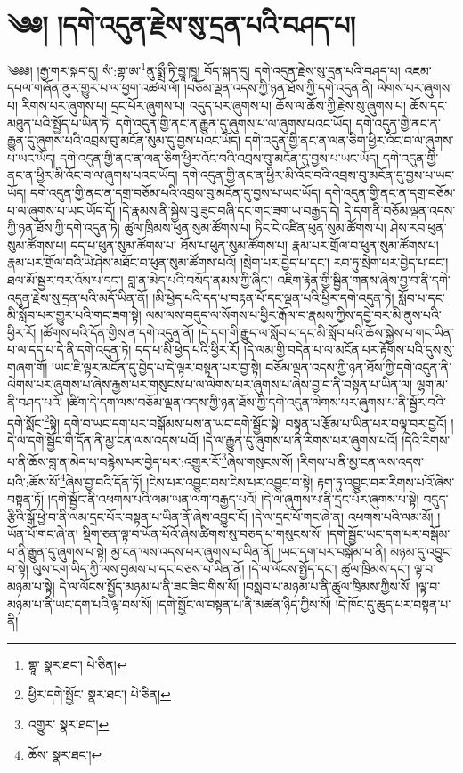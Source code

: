 \setcounter{footnote}{0} 
\chapter{༄༅། །དགེ་འདུན་རྗེས་སུ་དྲན་པའི་བཤད་པ།}༄༅༅། །རྒྱ་གར་སྐད་དུ། སཾ་:གྷ་ཨ་\footnote{གྷཱ་  སྣར་ཐང་།  པེ་ཅིན། }ནུ་སྨྲྀ་ཏི་བྱཱ་ཁྱཱ། བོད་སྐད་དུ། དགེ་འདུན་རྗེས་སུ་དྲན་པའི་བཤད་པ། འཇམ་དཔལ་གཞོན་ནུར་གྱུར་པ་ལ་ཕྱག་འཚལ་ལོ། །བཅོམ་ལྡན་འདས་ཀྱི་ཉན་ཐོས་ཀྱི་དགེ་འདུན་ནི། ལེགས་པར་ཞུགས་པ། རིགས་པར་ཞུགས་པ། དྲང་པོར་ཞུགས་པ། འདུད་པར་ཞུགས་པ། ཆོས་ལ་ཆོས་ཀྱི་རྗེས་སུ་ཞུགས་པ། ཆོས་དང་མཐུན་པའི་སྤྱོད་པ་ཡིན་ཏེ། དགེ་འདུན་གྱི་ནང་ན་རྒྱུན་དུ་ཞུགས་པ་ལ་ཞུགས་པའང་ཡོད། དགེ་འདུན་གྱི་ནང་ན་རྒྱུན་དུ་ཞུགས་པའི་འབྲས་བུ་མངོན་སུམ་དུ་བྱས་པའང་ཡོད། དགེ་འདུན་གྱི་ནང་ན་ལན་ཅིག་ཕྱིར་འོང་བ་ལ་ཞུགས་པ་ཡང་ཡོད། དགེ་འདུན་གྱི་ནང་ན་ལན་ཅིག་ཕྱིར་འོང་བའི་འབྲས་བུ་མངོན་དུ་བྱས་པ་ཡང་ཡོད། དགེ་འདུན་གྱི་ནང་ན་ཕྱིར་མི་འོང་བ་ལ་ཞུགས་པའང་ཡོད། དགེ་འདུན་གྱི་ནང་ན་ཕྱིར་མི་འོང་བའི་འབྲས་བུ་མངོན་དུ་བྱས་པ་ཡང་ཡོད། དགེ་འདུན་གྱི་ནང་ན་དགྲ་བཅོམ་པའི་འབྲས་བུ་མངོན་དུ་བྱས་པ་ཡང་ཡོད། དགེ་འདུན་གྱི་ནང་ན་དགྲ་བཅོམ་པ་ལ་ཞུགས་པ་ཡང་ཡོད་དོ། །དེ་རྣམས་ནི་སྐྱེས་བུ་ཟུང་བཞི་དང་གང་ཟག་ཡ་བརྒྱད་དེ། དེ་དག་ནི་བཅོམ་ལྡན་འདས་ཀྱི་ཉན་ཐོས་ཀྱི་དགེ་འདུན་ཏེ། ཚུལ་ཁྲིམས་ཕུན་སུམ་ཚོགས་པ། ཏིང་ངེ་འཛིན་ཕུན་སུམ་ཚོགས་པ། ཤེས་རབ་ཕུན་སུམ་ཚོགས་པ། དད་པ་ཕུན་སུམ་ཚོགས་པ། ཐོས་པ་ཕུན་སུམ་ཚོགས་པ། རྣམ་པར་གྲོལ་བ་ཕུན་སུམ་ཚོགས་པ། རྣམ་པར་གྲོལ་བའི་ཡེ་ཤེས་མཐོང་བ་ཕུན་སུམ་ཚོགས་པའོ། །སྲེག་པར་བྱེད་པ་དང་། རབ་ཏུ་སྲེག་པར་བྱེད་པ་དང་། ཐལ་མོ་སྦྱར་བར་འོས་པ་དང་། བླ་ན་མེད་པའི་བསོད་ནམས་ཀྱི་ཞིང་། འཇིག་རྟེན་གྱི་སྦྱིན་གནས་ཞེས་བྱ་བ་ནི་དགེ་འདུན་རྗེས་སུ་དྲན་པའི་མདོ་ཡིན་ནོ། །མི་ཕྱེད་པའི་དད་པ་བརྟན་པོ་དང་ལྡན་པའི་ཕྱིར་དགེ་འདུན་ཏེ། སློབ་པ་དང་མི་སློབ་པར་གྱུར་པའི་གང་ཟག་སྟེ། ལམ་ལས་བདུད་ལ་སོགས་པ་ཕྱིར་རྒོལ་བ་རྣམས་ཀྱིས་དབྱེ་བར་མི་ནུས་པའི་ཕྱིར་རོ། །ཚོགས་པའི་དོན་གྱིས་ན་དགེ་འདུན་ནོ། །དེ་དག་གི་རྒྱུད་ལ་སློབ་པ་དང་མི་སློབ་པའི་ཆོས་སྐྱེས་པ་གང་ཡིན་པ་ལ་དད་པ་དེ་ནི་དགེ་འདུན་ཏེ། དད་པ་མི་ཕྱེད་པའི་ཕྱིར་རོ། །དེ་ལམ་གྱི་བདེན་པ་ལ་མངོན་པར་རྟོགས་པའི་དུས་སུ་གཞག་གོ། །ཡང་ཇི་ལྟར་མངོན་དུ་བྱེད་པ་དེ་ལྟར་བསྟན་པར་བྱ་སྟེ། བཅོམ་ལྡན་འདས་ཀྱི་ཉན་ཐོས་ཀྱི་དགེ་འདུན་ནི་ལེགས་པར་ཞུགས་པ་ཞེས་རྒྱས་པར་གསུངས་པ་ལ་ལེགས་པར་ཞུགས་པ་ཞེས་བྱ་བ་ནི་བསྟན་པ་ཡིན་ལ། ལྷག་མ་ནི་བཤད་པའོ། །ཚིག་དེ་དག་ལས་བཅོམ་ལྡན་འདས་ཀྱི་ཉན་ཐོས་ཀྱི་དགེ་འདུན་ལེགས་པར་ཞུགས་པ་ནི་སྦྱོར་བའི་དགེ་སློང་\footnote{ཕྱིར་དགེ་སྦྱོང་  སྣར་ཐང་།  པེ་ཅིན། }སྟེ། དགེ་བ་ཡང་དག་པར་བསྒོམས་པས་ན་ཡང་དགེ་སྦྱོང་སྟེ། བསྟན་པ་རྩོམ་པ་ཡིན་པར་བལྟ་བར་བྱའོ། །དེ་ལ་དགེ་སྦྱོང་གི་དོན་ནི་མྱ་ངན་ལས་འདས་པའོ། །དེ་ལ་རྒྱུན་དུ་ཞུགས་པ་ནི་རིགས་པར་ཞུགས་པའོ། །དེའི་རིགས་པ་ནི་ཆོས་བླ་ན་མེད་པ་བརྙེས་པར་བྱེད་པར་:འགྱུར་རོ་\footnote{འགྱུར་  སྣར་ཐང་། }ཞེས་གསུངས་སོ། །རིགས་པ་ནི་མྱ་ངན་ལས་འདས་པའི་:ཆོས་སོ་\footnote{ཆོས་  སྣར་ཐང་། }ཞེས་བྱ་བའི་དོན་ཏོ། །ངེས་པར་འབྱུང་བས་ངེས་པར་འབྱུང་བ་སྟེ། རྟག་ཏུ་འབྱུང་བར་རིགས་པའོ་ཞེས་བསྟན་ཏོ། །དགེ་སྦྱོང་ནི་འཕགས་པའི་ལམ་ཡན་ལག་བརྒྱད་པའོ། །དེ་ལ་ཞུགས་པ་ནི་དྲང་པོར་ཞུགས་པ་སྟེ། བདུད་རྩིའི་སྒོ་ཕྱེ་བ་ནི་ལམ་དྲང་པོར་བསྟན་པ་ཡིན་ནོ་ཞེས་འབྱུང་ངོ། །དེ་ལ་དྲང་པོ་གང་ཞེ་ན། འཕགས་པའི་ལམ་མོ། །ཡོན་པོ་གང་ཞེ་ན། སྡིག་ཅན་ལྟ་བ་ཡོན་པོའོ་ཞེས་ཚིགས་སུ་བཅད་པ་གསུངས་སོ། །དགེ་སྦྱོང་ཡང་དག་པར་བསྒོམ་པ་ནི་རྒྱུན་དུ་ཞུགས་པ་སྟེ། མྱ་ངན་ལས་འདས་པར་ཞུགས་པ་ཡིན་ནོ། །ཡང་དག་པར་བསྒོམ་པ་ནི། མཉམ་དུ་འབྱུང་བ་སྟེ། ལུས་ངག་ཡིད་ཀྱི་ལས་བྱམས་པ་དང་བཅས་པ་ཡིན་ནོ། །དེ་ལ་ལོངས་སྤྱོད་དང་། ཚུལ་ཁྲིམས་དང་། ལྟ་བ་མཉམ་པ་སྟེ། དེ་ལ་ལོངས་སྤྱོད་མཉམ་པ་ནི་ཟང་ཟིང་གིས་སོ། །བསླབ་པ་མཉམ་པ་ནི་ཚུལ་ཁྲིམས་ཀྱིས་སོ། །ལྟ་བ་མཉམ་པ་ནི་ཡང་དག་པའི་ལྟ་བས་སོ། །དགེ་སྦྱོང་ལ་བསྟན་པ་ནི་མཚན་ཉིད་ཀྱིས་སོ། །དེ་ཁོང་དུ་ཆུད་པར་བསྟན་པ་ནི། 